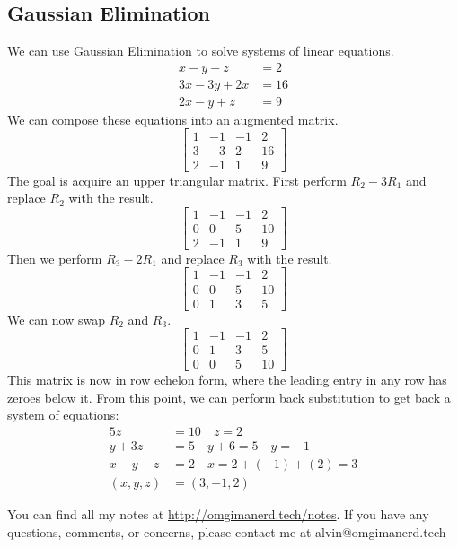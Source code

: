 \documentclass{math}
\begin{document}
\subsection*{Gaussian Elimination}
We can use Gaussian Elimination to solve systems of linear equations.
\begin{align*}
  x-y-z &= 2 \\
  3x-3y+2x &= 16 \\
  2x-y+z &= 9
\end{align*}
We can compose these equations into an augmented matrix.
\[ \begin{bmatrix}
  1 & -1 & -1 & 2 \\
  3 & -3 & 2 & 16 \\
  2 & -1 & 1 & 9
\end{bmatrix} \]
The goal is acquire an upper triangular matrix. First perform \( R_2-3R_1 \)
and replace \( R_2 \) with the result.
\[ \begin{bmatrix}
  1 & -1 & -1 & 2 \\
  0 & 0 & 5 & 10 \\
  2 & -1 & 1 & 9
\end{bmatrix} \]
Then we perform \( R_3-2R_1 \) and replace \( R_3 \) with the result.
\[ \begin{bmatrix}
  1 & -1 & -1 & 2 \\
  0 & 0 & 5 & 10 \\
  0 & 1 & 3 & 5
\end{bmatrix} \]
We can now swap \( R_2 \) and \( R_3 \).
\[ \begin{bmatrix}
  1 & -1 & -1 & 2 \\
  0 & 1 & 3 & 5 \\
  0 & 0 & 5 & 10
\end{bmatrix} \]
This matrix is now in row echelon form, where the leading entry in any row has
zeroes below it. From this point, we can perform back substitution to get back
a system of equations:
\begin{align*}
  5z &= 10 \quad z = 2 \\
  y+3z &= 5 \quad y+6 = 5 \quad y = -1 \\
  x-y-z &= 2 \quad x = 2+(-1)+(2) = 3 \\
  (x,y,z) &= (3,-1,2)
\end{align*}

\begin{center}
  You can find all my notes at \url{http://omgimanerd.tech/notes}. If you have
  any questions, comments, or concerns, please contact me at
  alvin@omgimanerd.tech
\end{center}
\end{document}
